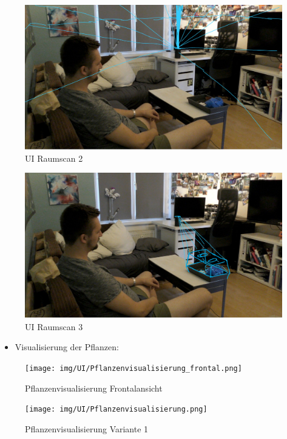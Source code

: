 \begin{figure}
\centering
\includegraphics{img/UI/Raumscan2.png}
\caption{UI Raumscan 2}
\end{figure}

\begin{figure}
\centering
\includegraphics{img/UI/Raumscan3.png}
\caption{UI Raumscan 3}
\end{figure}

\begin{itemize}
\tightlist
\item
  Visualisierung der Pflanzen:
\end{itemize}

\begin{figure}
\centering
\texttt{[image: img/UI/Pflanzenvisualisierung\_frontal.png]}
\caption{Pflanzenvisualisierung Frontalansicht}
\end{figure}

\begin{figure}
\centering
\texttt{[image: img/UI/Pflanzenvisualisierung.png]}
\caption{Pflanzenvisualisierung Variante 1}
\end{figure}

